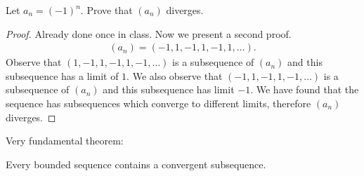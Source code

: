 
\begin{eg}
	Let $a_n = \left( -1 \right)^{n}$. Prove that $\left( a_n \right) $ diverges.
\end{eg}

\begin{proof}
	Already done once in class. Now we present a second proof.
	\begin{align}
		\left( a_n \right) = \left( -1, 1, -1, 1, -1, 1, \ldots \right).
	\end{align}
Observe that $\left( 1, -1, 1, -1, 1, -1, \ldots \right) $ is a subsequence of $\left( a_n \right) $ and this subsequence has a limit of $1$. We also observe that $\left( -1, 1, -1, 1, -1, \ldots \right) $ is a subsequence of $\left( a_n \right) $ and this subsequence has limit $-1$. We have found that the sequence has subsequences which converge to different limits, therefore  $\left( a_n \right) $ diverges.
\end{proof}


Very fundamental theorem:
\begin{theorem}
	Every bounded sequence contains a convergent subsequence. 
\end{theorem}

